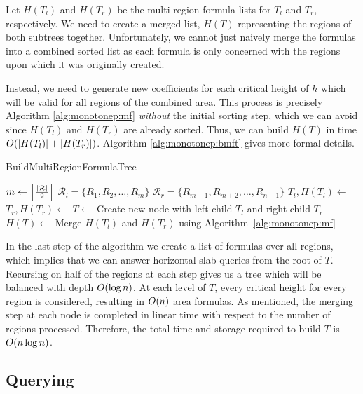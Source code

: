 Let $H(T_l)$ and $H(T_r)$ be the multi-region formula lists for $T_l$ and $T_r$, respectively. 
We need to create a merged list, $H(T)$ representing the regions of both subtrees together. 
Unfortunately, we cannot just naively merge the formulas into a combined sorted list as each formula is only concerned with the regions upon which it was originally created. 

Instead, we need to generate new coefficients for each critical height of $h$ which will be valid for all regions of the combined area.
This process is precisely Algorithm \ref{alg:monotonep:mf} \emph{without} the initial sorting step, which we can avoid since $H(T_l)$ and $H(T_r)$ are already sorted.
Thus, we can build $H(T)$ in time $O\!\left(|H(T_l)| + |H(T_r)|\right)$.
Algorithm \ref{alg:monotonep:bmft} gives more formal details.

\begin{algorithm}
\LinesNumbered
\DontPrintSemicolon
\caption{BuildMultiRegionFormulaTree}
\label{alg:monotonep:bmft}
\BlankLine
{}
$m \gets \left\lfloor\frac{|\mathcal{R}|}{2}\right\rfloor$\;
$\mathcal{R}_l = \{ R_1, R_2, \ldots, R_m \}$\;
$\mathcal{R}_r = \{ R_{m+1}, R_{m+2}, \ldots, R_{n-1} \}$\;
$T_l, H(T_l) \gets $ \;
$T_r, H(T_r) \gets $ \;
$T \gets $ Create new node with left child $T_l$ and right child $T_r$\;
$H(T) \gets $ Merge $H(T_l)$ and $H(T_r)$ using Algorithm~\ref{alg:monotonep:mf}\;
\BlankLine
{}
\end{algorithm}

In the last step of the algorithm we create a list of formulas over all regions, which implies that we can answer horizontal slab queries from the root of $T$. 
Recursing on half of the regions at each step gives us a tree which will be balanced with depth $O\!\left(\log{n}\right)$. 
At each level of $T$, every critical height for every region is considered, resulting in $O\!\left(n\right)$ area formulas.
As mentioned, the merging step at each node is completed in linear time with respect to the number of regions processed. 
Therefore, the total time and storage required to build $T$ is $O\!\left(n\log{n}\right)$.  


\subsection{Querying}
\label{:monotonep:rect:querying}

